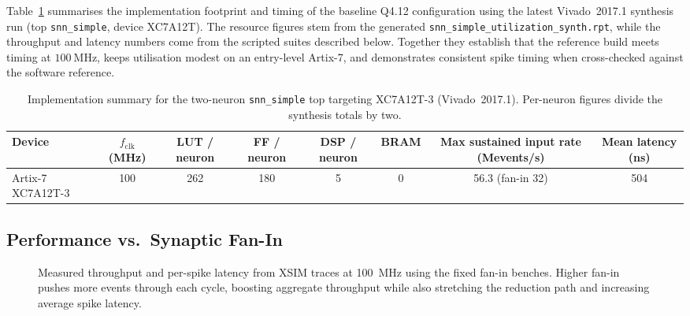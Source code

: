 \documentclass[10pt,onecolumn]{IEEEtran}
\begin{document}
Table~\ref{tab:summary} summarises the implementation footprint and timing of the baseline Q4.12 configuration using the latest Vivado~2017.1 synthesis run (top \texttt{snn\_simple}, device XC7A12T). The resource figures stem from the generated \texttt{snn\_simple\_utilization\_synth.rpt}, while the throughput and latency numbers come from the scripted suites described below. Together they establish that the reference build meets timing at \(100~\mathrm{MHz}\), keeps utilisation modest on an entry-level Artix-7, and demonstrates consistent spike timing when cross-checked against the software reference.

\begin{table}[H]
  \centering
  \small
  \caption{Implementation summary for the two-neuron \texttt{snn\_simple} top targeting XC7A12T-3 (Vivado~2017.1). Per-neuron figures divide the synthesis totals by two.}
  \label{tab:summary}
  \begin{tabular}{lccccccc}
    \toprule
    Device & $f_\mathrm{clk}$ (MHz) & LUT / neuron & FF / neuron & DSP / neuron & BRAM & Max sustained input rate (Mevents/s) & Mean latency (ns) \\
    \midrule
    Artix-7 XC7A12T-3 & 100 & 262 & 180 & 5 & 0 & 56.3 (fan-in 32) & 504 \\
    \bottomrule
  \end{tabular}
\end{table}

\subsection{Performance vs.\ Synaptic Fan-In}
\begin{figure}[t]
  \centering
  \caption{Measured throughput and per-spike latency from XSIM traces at 100~MHz using the fixed fan-in benches. Higher fan-in pushes more events through each cycle, boosting aggregate throughput while also stretching the reduction path and increasing average spike latency.}
  \label{fig:perf-fanin}
\end{figure}
\end{document}
